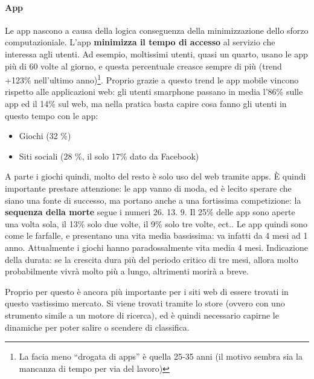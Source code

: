 \paragraph*{App}Le app nascono a causa della logica conseguenza della minimizzazione dello sforzo computazioniale. L'app \textbf{minimizza il tempo di accesso} al servizio che interessa agli utenti. Ad esempio, moltissimi utenti, quasi un quarto, usano le app pi\`u di 60 volte al giorno, e questa percentuale creasce sempre di pi\`u (trend +123\% nell'ultimo anno)\footnote{La facia meno ``drogata di apps'' \`e quella 25-35 anni (il motivo sembra sia la mancanza di tempo per via del lavoro)}. Proprio grazie a questo trend le app mobile vincono rispetto alle applicazioni web: gli utenti smarphone passano in media l'86\% sulle app ed il 14\% sul web, ma nella pratica basta capire cosa fanno gli utenti in questo tempo con le app:
\begin{itemize}

\item Giochi (32 \%)
\item Siti sociali (28 \%, il solo 17\% dato da Facebook)
  
\end{itemize}
A parte i giochi quindi, molto del resto \`e solo uso del web tramite apps. \`E quindi importante prestare attenzione: le app vanno di moda, ed \`e lecito sperare che siano una fonte di successo, ma portano anche a una fortissima competizione: la \textbf{sequenza della morte} segue i numeri 26. 13. 9. Il 25\% delle app sono aperte una volta sola, il 13\% solo due volte, il 9\% solo tre volte, ect..
Le app quindi sono come le farfalle, e presentano una vita media bassissima: va infatti da 4 mesi ad 1 anno. Attualmente i giochi hanno paradossalmente vita media 4 mesi. Indicazione della durata: se la crescita dura pi\`u del periodo critico di tre mesi, allora molto probabilmente vivr\`a molto pi\`u a lungo, altrimenti morir\`a a breve.

Proprio per questo \`e ancora pi\`u importante per i siti web di essere trovati in questo vastissimo mercato. Si viene trovati tramite lo store (ovvero con uno strumento simile a un motore di ricerca), ed \`e quindi necessario capirne le dinamiche per poter salire o scendere di classifica.


